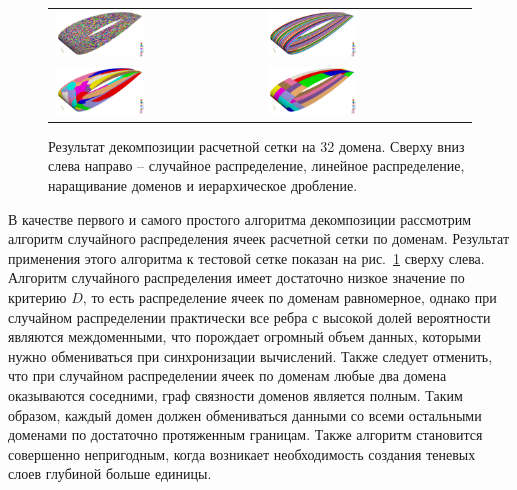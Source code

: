 \begin{figure}[ht]
\centering
\begin{tabular}{ll}
\includegraphics[width=0.45\textwidth]{fig/par_wing_random_32.png}
&
\includegraphics[width=0.45\textwidth]{fig/par_wing_linear_32.png}
\\
\includegraphics[width=0.45\textwidth]{fig/par_wing_rgrow_32.png}
&
\includegraphics[width=0.45\textwidth]{fig/par_wing_hierarchical_32.png}
\end{tabular}
\singlespacing
{}\caption{Результат декомпозиции расчетной сетки на 32 домена. Сверху вниз слева направо -- случайное распределение, линейное распределение, наращивание доменов и иерархическое дробление.}
\label{fig:text_2_decompsurf_4}
\end{figure}

В качестве первого и самого простого алгоритма декомпозиции рассмотрим алгоритм случайного распределения ячеек расчетной сетки по доменам.
Результат применения этого алгоритма к тестовой сетке показан на рис.~\ref{fig:text_2_decompsurf_4} сверху слева.
Алгоритм случайного распределения имеет достаточно низкое значение по критерию $D$, то есть распределение ячеек по доменам равномерное, однако при случайном распределении практически все ребра с высокой долей вероятности являются междоменными, что порождает огромный объем данных, которыми нужно обмениваться при синхронизации вычислений.
Также следует отменить, что при случайном распределении ячеек по доменам любые два домена оказываются соседними, граф связности доменов является полным.
Таким образом, каждый домен должен обмениваться данными со всеми остальными доменами по достаточно протяженным границам.
Также алгоритм становится совершенно непригодным, когда возникает необходимость создания теневых слоев глубиной больше единицы.

